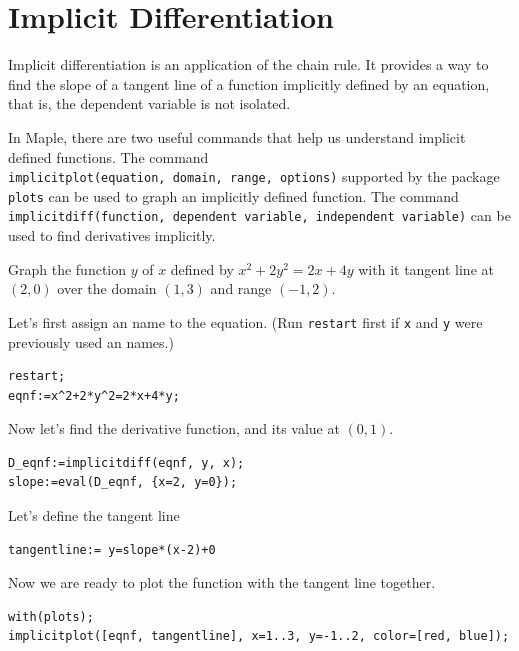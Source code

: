 \documentclass[]{book}
\theoremstyle{definition}
\theoremstyle{definition}
\theoremstyle{definition}
\theoremstyle{remark}
\let\BeginKnitrBlock\begin \let\EndKnitrBlock\end
\begin{document}
\hypertarget{implicit-differentiation}{%
\section{Implicit Differentiation}\label{implicit-differentiation}}

Implicit differentiation is an application of the chain rule. It provides a way to find the slope of a tangent line of a function implicitly defined by an equation, that is, the dependent variable is not isolated.

In Maple, there are two useful commands that help us understand implicit defined functions.
The command \texttt{implicitplot(equation,\ domain,\ range,\ options)} supported by the package \texttt{plots} can be used to graph an implicitly defined function.
The command \texttt{implicitdiff(function,\ dependent\ variable,\ independent\ variable)} can be used to find derivatives implicitly.

\BeginKnitrBlock{example}
\protect\hypertarget{exm:unnamed-chunk-65}{}{\label{exm:unnamed-chunk-65} }
Graph the function \(y\) of \(x\) defined by \(x^2+2y^2=2x+4y\) with it tangent line at \((2, 0)\) over the domain \((1, 3)\) and range \((-1, 2)\).
\EndKnitrBlock{example}

\BeginKnitrBlock{solution}
{}
Let's first assign an name to the equation. (Run \texttt{restart} first if \texttt{x} and \texttt{y} were previously used an names.)

\begin{verbatim}
restart;
eqnf:=x^2+2*y^2=2*x+4*y;
\end{verbatim}

Now let's find the derivative function, and its value at \((0, 1)\).

\begin{verbatim}
D_eqnf:=implicitdiff(eqnf, y, x);
slope:=eval(D_eqnf, {x=2, y=0});
\end{verbatim}

Let's define the tangent line

\begin{verbatim}
tangentline:= y=slope*(x-2)+0
\end{verbatim}

Now we are ready to plot the function with the tangent line together.

\begin{verbatim}
with(plots);
implicitplot([eqnf, tangentline], x=1..3, y=-1..2, color=[red, blue]);
\end{verbatim}
\EndKnitrBlock{solution}
\end{document}
